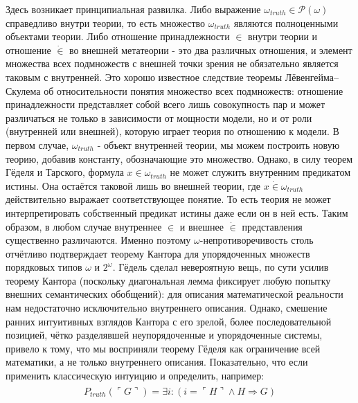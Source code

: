 \documentclass[12pt]{article}
\begin{document}
Здесь возникает принципиальная развилка. Либо выражение $\omega_{truth} \in \mathcal{P}(\omega)$ справедливо внутри теории, то есть множество $\omega_{truth}$ являются полноценными объектами теории. Либо отношение принадлежности $\in$ внутри теории и отношение $\dot{\in}$ во внешней метатеории - это два различных отношения, и элемент множества всех подмножеств с внешней точки зрения не обязательно является таковым с внутренней. Это хорошо известное следствие теоремы Лёвенгейма–Скулема об относительности понятия множество всех подмножеств: отношение принадлежности представляет собой всего лишь совокупность пар и может различаться не только в зависимости от мощности модели, но и от роли (внутренней или внешней), которую играет теория по отношению к модели. В первом случае, $\omega_{truth}$ - объект внутренней теории, мы можем построить новую теорию, добавив константу, обозначающие это множество. Однако, в силу теорем Гёделя и Тарского, формула $x \in \omega_{truth}$ не может служить внутренним предикатом истины. Она остаётся таковой лишь во внешней теории, где $x \dot{\in} \omega_{truth}$ действительно выражает соответствующее понятие. То есть теория не может интерпретировать собственный предикат истины даже если он в ней есть. Таким образом, в любом случае внутреннее $\in$ и внешнее $\dot{\in}$ представления существенно различаются. Именно поэтому $\omega$-непротиворечивость столь отчётливо подтверждает теорему Кантора для упорядоченных множеств порядковых типов $\omega$ и $2^\omega$. Гёдель сделал невероятную вещь, по сути усилив теорему Кантора (поскольку диагональная лемма фиксирует любую попытку внешних семантических обобщений): для описания математической реальности нам недостаточно исключительно внутреннего описания. Однако, смешение ранних интуитивных взглядов Кантора с его зрелой, более последовательной позицией, чётко разделявшей неупорядоченные и упорядоченные системы, привело к тому, что мы восприняли теорему Гёделя как ограничение всей математики, а не только внутреннего описания. Показательно, что если применить классическую интуицию и определить, например:
\begin{align}
\begin{split}
P_{truth}(\ulcorner G \urcorner) = \exists i : (i = \ulcorner H \urcorner \wedge H \Rightarrow G)
\end{split}
\end{align}
\end{document}
